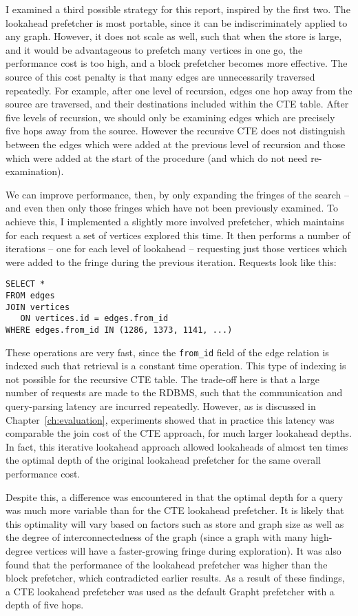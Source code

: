 I examined a third possible strategy for this report, inspired by the first
two.  The lookahead prefetcher is most portable, since it can be
indiscriminately applied to any graph. However, it does not scale as well,
such that when the store is large, and it would be advantageous to prefetch
many vertices in one go, the performance cost is too high, and a block
prefetcher becomes more effective. The source of this cost penalty is that
many edges are unnecessarily traversed repeatedly. For example, after one
level of recursion, edges one hop away from the source are traversed, and
their destinations included within the CTE table. After five levels of
recursion, we should only be examining edges which are precisely five hops
away from the source. However the recursive CTE does not distinguish between
the edges which were added at the previous  level of recursion and those which
were added at the start of the procedure (and which do not need re-examination).

We can improve performance, then, by only expanding the fringes of the search
-- and even then only those fringes which have not been previously examined.
To achieve this, I implemented a slightly more involved prefetcher, which
maintains for each request a set of vertices explored this time. It then performs
a number of iterations -- one for each level of lookahead -- requesting just those 
vertices which were added to the fringe during the previous iteration. Requests
look like this: 

\begin{verbatim}
SELECT *
FROM edges
JOIN vertices
   ON vertices.id = edges.from_id
WHERE edges.from_id IN (1286, 1373, 1141, ...)
\end{verbatim}

These operations are very fast, since the \texttt{from\_id} field of the edge
relation is indexed such that retrieval is a constant time operation. This
type of indexing is not possible for the recursive CTE table. The trade-off
here is that a large number of requests are made to the RDBMS, such that the
communication and query-parsing latency are incurred repeatedly. However, as
is discussed in Chapter~\ref{ch:evaluation}, experiments showed that in
practice this latency was comparable the join cost of the CTE approach, for much
larger lookahead depths. In fact, this iterative lookahead approach allowed
lookaheads of almost ten times the optimal depth of the original lookahead
prefetcher for the same overall performance cost. 

Despite this, a difference was encountered in that the optimal depth for a
query was much more variable than for the CTE lookahead prefetcher. It is
likely that this optimality will vary based on factors such as store and graph
size as well as the degree of interconnectedness of the graph (since a graph
with many high-degree vertices will have a faster-growing fringe during
exploration). It was also found that the performance of the lookahead
prefetcher was higher than the block prefetcher, which contradicted earlier
results. As a result of these findings, a CTE lookahead prefetcher was used as
the default Grapht prefetcher with a depth of five hops.





